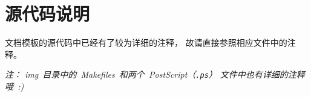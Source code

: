 \chapter{源代码说明}

文档模板的源代码中已经有了较为详细的注释，
故请直接参照相应文件中的注释。

\emph
{%
	注：%
	img~目录中的~Makefiles~和两个~PostScript（\texttt{.ps}）%
	文件中也有详细的注释哦~:)
}

